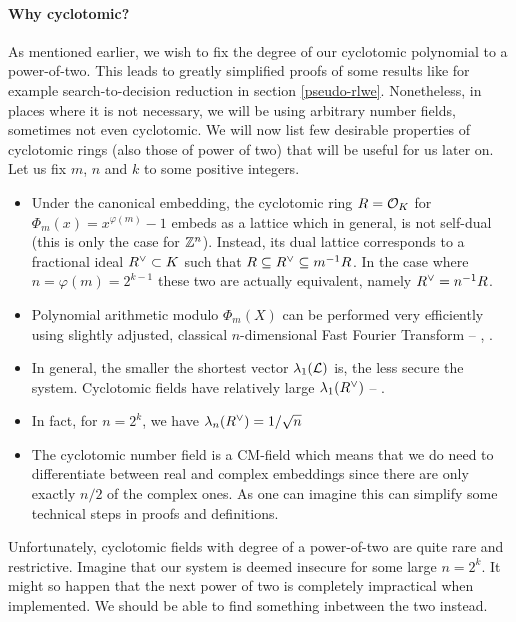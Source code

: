 \paragraph{Why cyclotomic?}\label{why?}
As mentioned earlier, we wish to fix the degree of our cyclotomic polynomial to a power-of-two. This leads to greatly simplified proofs of some results like for example search-to-decision reduction in section \ref{pseudo-rlwe}. Nonetheless, in places where it is not necessary, we will be using arbitrary number fields, sometimes not even cyclotomic. We will now list few desirable properties of cyclotomic rings (also those of power of two) that will be useful for us later on. Let us fix $m$, $n$ and $k$ to some positive integers.
\begin{itemize}
	\item Under the canonical embedding, the cyclotomic ring $R = \mathcal{O}_K$ for $\Phi_m(x) = x^{\varphi(m)} - 1$ embeds as a lattice which in general, is not self-dual (this is only the case for $\mathbb{Z}^n$). Instead, its dual lattice corresponds to a fractional ideal $R^{\vee} \subset K$ such that $R \subseteq R^{\vee} \subseteq m^{-1}R$. In the case where $n = \varphi(m) =  2^{k-1}$ these two are actually equivalent, namely $R^{\vee} = n^{-1}R$. 
	\item Polynomial arithmetic modulo $\Phi_m(X)$ can be performed very efficiently using slightly adjusted, classical $n$-dimensional Fast Fourier Transform -- \cite{toolkit}, \cite{swift}.
	\item In general, the smaller the shortest vector $\lambda_1(\mathcal{L})$ is, the less secure the system. Cyclotomic fields have relatively large $\lambda_1(R^{\vee})$ -- \cite{oracle}.
	\item In fact, for $n = 2^k$, we have $\lambda_n(R^{\vee}) = 1/\sqrt{n}$
	\item The cyclotomic number field is a CM-field which means that we do need to differentiate between real and complex embeddings since there are only exactly $n/2$ of the complex ones. As one can imagine this can simplify some technical steps in proofs and definitions.
\end{itemize}
Unfortunately, cyclotomic fields with degree of a power-of-two are quite rare and restrictive. Imagine that our system is deemed insecure for some large $n = 2^k$. It might so happen that the next power of two is completely impractical when implemented. We should be able to find something inbetween the two instead.
